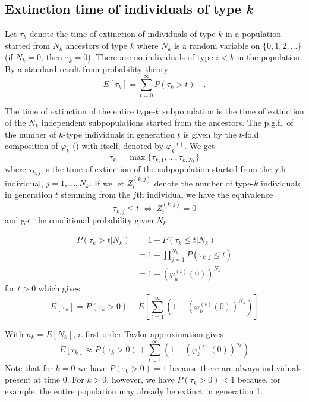 \documentclass[9pt,lineno]{elife}
\begin{document}
\subsection{Extinction time of individuals of type \emph{k}}


Let $\tau_k$ denote the time of extinction of individuals of type $k$ in a population started from $N_{k}$ ancestors of type $k$ where $N_k$ is a random variable on $\{0,1,2,...\}$ (if $N_k=0$, then $\tau_k=0$).  
There are no individuals of type $i < k$ in the population.
By a standard result from probability theory
%
\[ E[\tau_k]=\sum_{t=0}^{\infty}P(\tau_k>t) \quad . \]

The time of extinction of the entire type-$k$ subpopulation is the time of extinction of the $N_{k}$ independent subpopulations started from the ancestors. The p.g.f.\ of the number of $k$-type individuals in generation $t$ is given by the $t$-fold composition of $\varphi_k$ () with itself, denoted by $\varphi^{(t)}_k$. We get
%
\[ \tau_{k}=\max\{\tau_{k,1},...,\tau_{k,N_{k}}\} \]   
%
where $\tau_{k,j}$ is the time of extinction of the subpopulation started from the $j$th individual, $j=1,...,N_k$. If we let $Z_{t}^{(k,j)}$ denote the number of type-$k$ individuals in generation $t$ stemming from the $j$th individual we have the equivalence 
%
\[ \tau_{k,j}\leq t \; \Leftrightarrow \; Z_{t}^{(k,j)}=0 \]
%
and get the conditional probability given $N_k$

\begin{align*}
%
P(\tau_{k}>t|N_k) & =  1-P(\tau_{k}\leq t|N_k)\\[3pt]
           & =  1-\prod_{j=1}^{N_{k}}P(\tau_{k,j}\leq t)\\[3pt]
           & =  1-\left(\varphi_{k}^{(t)}(0)\right)^{N_{k}}
\end{align*}
%
for $t>0$ which gives 
%
%
\[ E[\tau_{k}] = P(\tau_{k}>0) + E\left[\sum_{t=1}^{\infty}\left(1-\left(\varphi_{k}^{(t)}(0)\right)^{N_{k}}\right)\right] \]
%

With $n_k=E[N_k]$, a first-order Taylor approximation gives 
%
\begin{equation}
%
E[\tau_{k}] \approx P(\tau_{k}>0) + \sum_{t=1}^{\infty}\left(1-\left(\varphi_{k}^{(t)}(0)\right)^{n_{k}}\right)
%
\label{eq:tauk}
\end{equation}
%
Note that for $k=0$ we have $P(\tau_{0}>0)=1$ because there are always individuals present at time $0$. For $k>0$, however, we have $P(\tau_{k}>0)<1$ because, for example, 
the entire population may already be extinct
in generation 1. 
\end{document}
